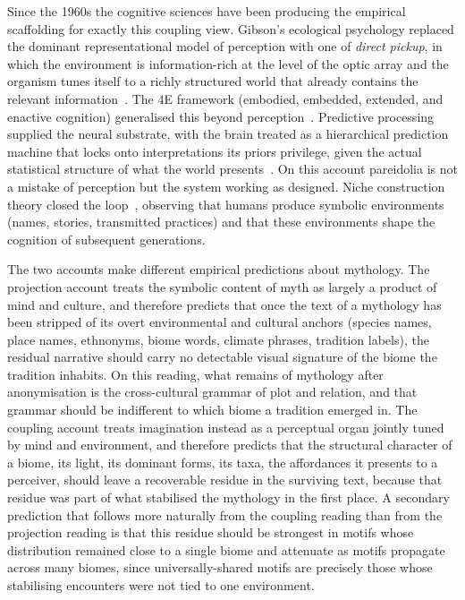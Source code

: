 \documentclass[11pt,a4paper]{article}
\begin{document}
Since the 1960s the cognitive sciences have been producing the
empirical scaffolding for exactly this coupling view. Gibson's
ecological psychology replaced the dominant representational model
of perception with one of \emph{direct pickup}, in which the
environment is information-rich at the level of the optic array and
the organism tunes itself to a richly structured world that already
contains the relevant
information~\citep{gibson1979ecological}. The 4E framework
(embodied, embedded, extended, and enactive cognition) generalised
this beyond
perception~\citep{varela1991embodied,clark1998extended,noe2004action}.
Predictive processing supplied the neural substrate, with the brain
treated as a hierarchical prediction machine that locks onto
interpretations its priors privilege, given the actual statistical
structure of what the world
presents~\citep{friston2010free,clark2016surfing,hohwy2013predictive}.
On this account pareidolia is not a mistake of perception but the
system working as designed. Niche construction theory closed the
loop~\citep{odlingsmee2003niche}, observing that humans produce
symbolic environments (names, stories, transmitted practices) and
that these environments shape the cognition of subsequent generations.

The two accounts make different empirical predictions about
mythology. The projection account treats the symbolic content of
myth as largely a product of mind and culture, and therefore
predicts that once the text of a mythology has been stripped of its
overt environmental and cultural anchors (species names, place
names, ethnonyms, biome words, climate phrases, tradition labels),
the residual narrative should carry no detectable visual signature
of the biome the tradition inhabits.
On this reading, what remains of mythology after anonymisation is
the cross-cultural grammar of plot and relation, and that grammar
should be indifferent to which biome a tradition emerged in. The
coupling account treats imagination instead as a perceptual organ
jointly tuned by mind and environment, and therefore predicts that
the structural character of a biome, its light, its dominant forms,
its taxa, the affordances it presents to a perceiver, should leave
a recoverable residue in the surviving text, because that residue
was part of what stabilised the mythology in the first place. A
secondary prediction that follows more naturally from the coupling
reading than from the projection reading is that this residue
should be strongest in motifs whose distribution remained close to
a single biome and attenuate as motifs propagate across many
biomes, since universally-shared motifs are precisely those whose
stabilising encounters were not tied to one environment.
\end{document}
